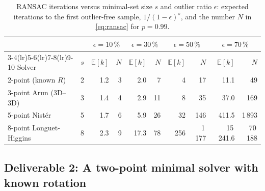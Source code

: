 \documentclass[11pt,a4paper]{article}
\begin{document}
\begin{table}[H]
  \centering\small
  \caption{RANSAC iterations versus minimal-set size $s$ and outlier ratio
    $\epsilon$: expected iterations to the first outlier-free sample,
    $1/(1-\epsilon)^s$, and the number $N$ in \eqref{eq:ransac} for $p = 0.99$.}
  \label{tab:ransac}
  \begin{tabular}{l c rr rr rr rr}
    \toprule
    & & \multicolumn{2}{c}{$\epsilon = 10\,\%$} & \multicolumn{2}{c}{$\epsilon = 30\,\%$}
    & \multicolumn{2}{c}{$\epsilon = 50\,\%$} & \multicolumn{2}{c}{$\epsilon = 70\,\%$} \\
    \cmidrule(lr){3-4}\cmidrule(lr){5-6}\cmidrule(lr){7-8}\cmidrule(lr){9-10}
    Solver & $s$ & $\mathbb{E}[k]$ & $N$ & $\mathbb{E}[k]$ & $N$ & $\mathbb{E}[k]$ & $N$ & $\mathbb{E}[k]$ & $N$ \\
    \midrule
    2-point (known $R$) & 2 & 1.2 & 3 & 2.0 & 7 & 4 & 17 & 11.1 & 49 \\
    3-point Arun (3D--3D) & 3 & 1.4 & 4 & 2.9 & 11 & 8 & 35 & 37.0 & 169 \\
    5-point Nist\'er & 5 & 1.7 & 6 & 5.9 & 26 & 32 & 146 & 411.5 & 1\,893 \\
    8-point Longuet-Higgins & 8 & 2.3 & 9 & 17.3 & 78 & 256 & 1\,177 & 15\,241.6 & 70\,188 \\
    \bottomrule
  \end{tabular}
\end{table}

\subsection{Deliverable 2: A two-point minimal solver with known rotation}
\end{document}
